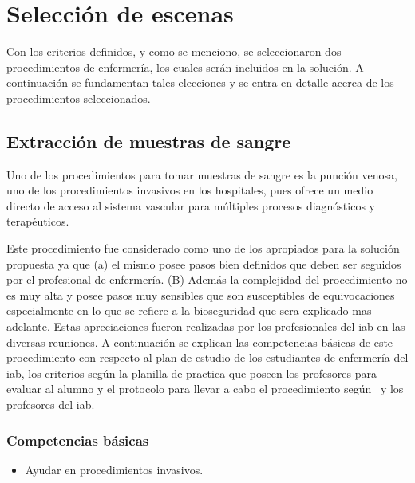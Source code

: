 \section{Selección de escenas}
\label{sec:seleccion_escenas}



Con los criterios definidos, y como se menciono, se seleccionaron dos
procedimientos de enfermería, los cuales serán incluidos en la solución. A
continuación se fundamentan tales elecciones y se entra en detalle acerca de los
procedimientos seleccionados.

\subsection{Extracción de muestras de sangre}
\label{sec:hemocultivo}

Uno de los procedimientos  para tomar muestras
de sangre es la punción venosa, uno de los procedimientos invasivos  en los hospitales, pues ofrece un medio directo
de acceso al sistema vascular para múltiples procesos diagnósticos y
terapéuticos.

Este procedimiento fue considerado como uno de los apropiados para la solución
propuesta ya que (a) el mismo posee pasos bien definidos que deben ser seguidos por
el profesional de enfermería. (B) Además la complejidad del procedimiento no es
muy alta y posee pasos muy sensibles que son susceptibles de equivocaciones
especialmente en lo que se refiere a la bioseguridad que sera explicado mas
adelante. Estas apreciaciones fueron realizadas por los profesionales del
\Gls{iab} en las diversas reuniones. A continuación se explican las competencias
básicas de este procedimiento con respecto al plan de estudio de los estudiantes
de enfermería del \Gls{iab}, los criterios según la planilla de practica que
poseen los profesores para evaluar al alumno y el protocolo para llevar a cabo
el procedimiento según~\cite{oms:extraccion} y los profesores del \Gls{iab}.



\subsubsection{Competencias básicas}
\begin{itemize}
\item Ayudar en procedimientos invasivos.
\end{itemize}

